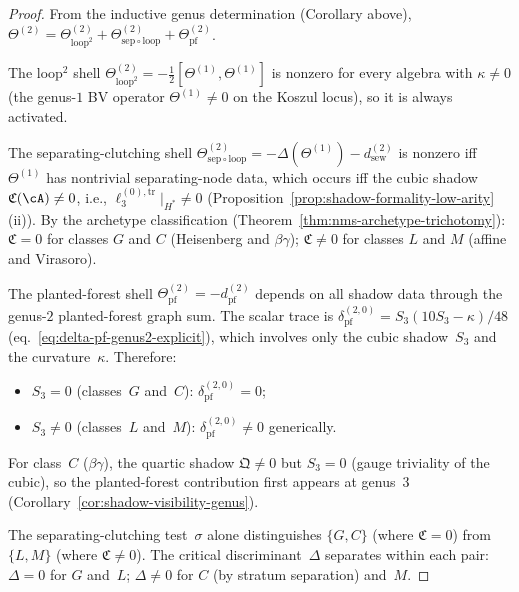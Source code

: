 \begin{proof}
From the inductive genus determination
(Corollary above),
$\Theta^{(2)} = \Theta^{(2)}_{\mathrm{loop}^2}
+ \Theta^{(2)}_{\mathrm{sep}\circ\mathrm{loop}}
+ \Theta^{(2)}_{\mathrm{pf}}$.

The loop${}^2$ shell
$\Theta^{(2)}_{\mathrm{loop}^2} =
-\tfrac{1}{2}[\Theta^{(1)}, \Theta^{(1)}]$
is nonzero for every algebra with $\kappa \neq 0$
(the genus-$1$ BV operator $\Theta^{(1)} \neq 0$
on the Koszul locus), so it is always activated.

The separating-clutching shell
$\Theta^{(2)}_{\mathrm{sep}\circ\mathrm{loop}} =
-\Delta(\Theta^{(1)}) - d_{\mathrm{sew}}^{(2)}$
is nonzero iff $\Theta^{(1)}$ has nontrivial
separating-node data, which occurs iff the cubic
shadow $\mathfrak{C}(\cA) \neq 0$, i.e.,
$\ell_3^{(0),\mathrm{tr}}|_{H^*} \neq 0$
(Proposition~\ref{prop:shadow-formality-low-arity}(ii)).
By the archetype classification
(Theorem~\ref{thm:nms-archetype-trichotomy}):
$\mathfrak{C} = 0$ for classes $G$ and $C$ (Heisenberg
and $\beta\gamma$); $\mathfrak{C} \neq 0$ for classes
$L$ and $M$ (affine and Virasoro).

The planted-forest shell
$\Theta^{(2)}_{\mathrm{pf}} = -d_{\mathrm{pf}}^{(2)}$
depends on all shadow data through the genus-$2$
planted-forest graph sum.  The scalar trace is
$\delta_{\mathrm{pf}}^{(2,0)} = S_3(10S_3 - \kappa)/48$
(eq.~\eqref{eq:delta-pf-genus2-explicit}), which involves
only the cubic shadow~$S_3$ and the curvature~$\kappa$.
Therefore:
\begin{itemize}
\item $S_3 = 0$ (classes~$G$ and~$C$):
$\delta_{\mathrm{pf}}^{(2,0)} = 0$;
\item $S_3 \neq 0$ (classes~$L$ and~$M$):
$\delta_{\mathrm{pf}}^{(2,0)} \neq 0$ generically.
\end{itemize}
For class~$C$ ($\beta\gamma$), the quartic shadow
$\mathfrak{Q} \neq 0$ but $S_3 = 0$
(gauge triviality of the cubic), so the
planted-forest contribution first appears at genus~$3$
(Corollary~\ref{cor:shadow-visibility-genus}).

The separating-clutching test~$\sigma$ alone distinguishes
$\{G, C\}$ (where $\mathfrak{C} = 0$) from $\{L, M\}$
(where $\mathfrak{C} \neq 0$).  The critical
discriminant~$\Delta$ separates within each pair:
$\Delta = 0$ for $G$ and~$L$; $\Delta \neq 0$ for
$C$ (by stratum separation) and~$M$.
\end{proof}

